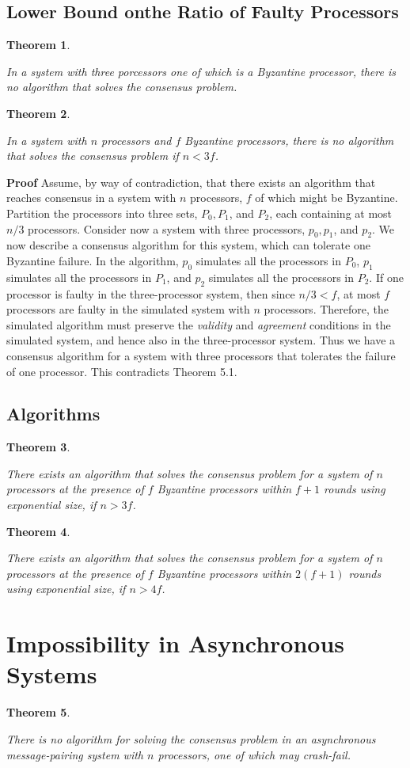 \documentclass{article}
\newtheorem{thm}{Theorem}[section]
\newenvironment{theorem}{\begin{thm}\begin{rm}}%
{\end{rm}\end{thm}}
\begin{document}
\subsection{Lower Bound onthe Ratio of Faulty Processors}
\begin{theorem} In a system with three porcessors one of which is a Byzantine processor, there is no algorithm that solves the consensus problem.
\end{theorem}
\begin{theorem}
In a system with $n$ processors and $f$ Byzantine processors, there is no algorithm that solves the consensus problem if $n < 3f$. 
\end{theorem}
\textbf{Proof} Assume, by way of contradiction, that there exists an algorithm that reaches consensus in a system with $n$ processors, $f$ of which might be Byzantine. Partition the processors into three sets, $P_0,P_1$, and $P_2$, each containing at most $n/3$ processors. Consider now a system with three processors, $p_0, p_1$, and $p_2$. We now describe a consensus algorithm for this system, which can tolerate one Byzantine failure. In the algorithm, $p_0$ simulates all the processors in $P_0$, $p_1$ simulates all the processors in $P_1$, and $p_2$ simulates all the processors in $P_2$. If one processor is faulty in the three-processor system, then since $n/3 < f$, at most $f$ processors are faulty in the simulated system with $n$ processors. Therefore, the simulated algorithm must preserve the \textit{validity} and \textit{agreement} conditions in the simulated system, and hence also in the three-processor system. Thus we have a consensus algorithm for a system with three processors that tolerates the failure of one processor. This contradicts Theorem 5.1.


\subsection{Algorithms}
\begin{theorem}
There exists an algorithm that solves the consensus problem for a system of $n$ processors at the presence of $f$ Byzantine processors within $f+1$ rounds using exponential size, if $n > 3f$.
\end{theorem}

\begin{theorem}
There exists an algorithm that solves the consensus problem for a system of $n$ processors at the presence of $f$ Byzantine processors within $2(f+1)$ rounds using exponential size, if $n > 4f$.
\end{theorem}

\section{Impossibility in Asynchronous Systems}
\begin{theorem}There is no algorithm for solving the consensus problem in an asynchronous message-pairing system with $n$ processors, one of which may crash-fail.
\end{theorem}

%
%
\end{document}
